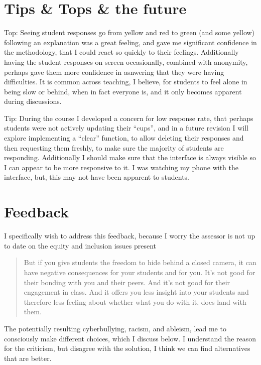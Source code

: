 \documentclass[paper=a4,justified,a4paper]{tufte-handout}
\begin{document}
\hypertarget{tips-tops-the-future}{%
\section{Tips \& Tops \& the future}\label{tips-tops-the-future}}

Top: Seeing student responses go from yellow and red to green (and some
yellow) following an explanation was a great feeling, and gave me
significant confidence in the methodology, that I could react so quickly
to their feelings. Additionally having the student responses on screen
occasionally, combined with anonymity, perhaps gave them more confidence
in asnwering that they were having difficulties. It is common across
teaching, I believe, for students to feel alone in being slow or behind,
when in fact everyone is, and it only becomes apparent during
discussions.

Tip: During the course I developed a concern for low response rate, that
perhaps students were not actively updating their ``cups'', and in a
future revision I will explore implementing a ``clear'' function, to
allow deleting their responses and then requesting them freshly, to make
sure the majority of students are responding. Additionally I should make
sure that the interface is always visible so I can appear to be more
responsive to it. I was watching my phone with the interface, but, this
may not have been apparent to students.

\hypertarget{feedback}{%
\section{Feedback}\label{feedback}}

I specifically wish to address this feedback, because I worry the
assessor is not up to date on the equity and inclusion issues present

\begin{quote}
But if you give students the freedom to hide behind a closed camera, it
can have negative consequences for your students and for you. It's not
good for their bonding with you and their peers. And it's not good for
their engagement in class. And it offers you less insight into your
students and therefore less feeling about whether what you do with it,
does land with them.
\end{quote}

The potentially resulting cyberbullying, racism, and ableism, lead me to
consciously make different choices, which I discuss below. I understand
the reason for the criticism, but disagree with the solution, I think we
can find alternatives that are better.
\end{document}
